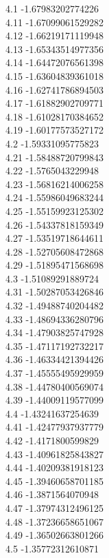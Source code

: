 {4.1	-1.67983202774226\\
4.11	-1.67099061529282\\
4.12	-1.66219171119948\\
4.13	-1.65343514977356\\
4.14	-1.64472076561398\\
4.15	-1.63604839361018\\
4.16	-1.62741786894503\\
4.17	-1.61882902709771\\
4.18	-1.61028170384652\\
4.19	-1.60177573527172\\
4.2	-1.59331095775823\\
4.21	-1.58488720799843\\
4.22	-1.5765043229948\\
4.23	-1.56816214006258\\
4.24	-1.55986049683244\\
4.25	-1.55159923125302\\
4.26	-1.54337818159349\\
4.27	-1.53519718644611\\
4.28	-1.52705608472868\\
4.29	-1.51895471568698\\
4.3	-1.51089291889724\\
4.31	-1.50287053426846\\
4.32	-1.49488740204482\\
4.33	-1.48694336280796\\
4.34	-1.47903825747928\\
4.35	-1.47117192732217\\
4.36	-1.46334421394426\\
4.37	-1.45555495929959\\
4.38	-1.44780400569074\\
4.39	-1.44009119577099\\
4.4	-1.43241637254639\\
4.41	-1.42477937937779\\
4.42	-1.4171800599829\\
4.43	-1.40961825843827\\
4.44	-1.40209381918123\\
4.45	-1.39460658701185\\
4.46	-1.3871564070948\\
4.47	-1.37974312496125\\
4.48	-1.37236658651067\\
4.49	-1.36502663801266\\
4.5	-1.35772312610871\\
}
